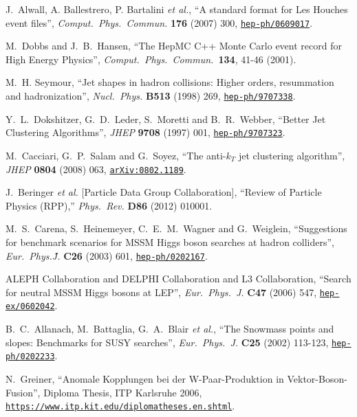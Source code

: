 \documentclass[english,12pt]{article}
\begin{document}
\begin{thebibliography}{10}
J.~Alwall, A. Ballestrero, P. Bartalini {\em et al.}, ``A standard format for Les Houches event files'', {\em
  Comput.\ Phys.\ Commun.} {\bf 176} (2007) 300,
\href{https://www.arXiv.org/abs/hep-ph/0609017}{{\tt hep-ph/0609017}}.

  M.~Dobbs and J.~B.~Hansen,
  ``The HepMC C++ Monte Carlo event record for High Energy Physics'',
  {\em Comput.\ Phys.\ Commun.\  }{\bf 134}, 41-46 (2001).

M.~H. Seymour, ``{Jet shapes in hadron collisions: Higher orders, resummation
  and hadronization}'', {\em Nucl.\ Phys.} {\bf B513} (1998) 269,
\href{https://www.arXiv.org/abs/hep-ph/9707338}{{\tt hep-ph/9707338}}.

  Y.~L.~Dokshitzer, G.~D.~Leder, S.~Moretti and B.~R.~Webber,
  ``Better Jet Clustering Algorithms'',
  {\em JHEP} {\bf 9708} (1997) 001,
  \href{https://arxiv.org/abs/hep-ph/9707323}{{\tt hep-ph/9707323}}.

  M.~Cacciari, G.~P.~Salam and G.~Soyez,
  ``The anti-$k_T$ jet clustering algorithm'',
  {\em JHEP} {\bf 0804} (2008) 063,
  \href{https://arxiv.org/abs/0802.1189}{{\tt arXiv:0802.1189}}.

  J.~Beringer {\it et al.}  [Particle Data Group Collaboration],
  ``Review of Particle Physics (RPP),''
   {\em Phys.\ Rev.} {\bf D86} (2012) 010001.

  M.~S.~Carena, S.~Heinemeyer, C.~E.~M.~Wagner and G.~Weiglein,
  ``Suggestions for benchmark scenarios for MSSM Higgs boson searches at
  hadron colliders'',
  {\em Eur.\ Phys.\~J.} {\bf C26} (2003) 601,
\href{https://www.arXiv.org/abs/hep-ph/0202167}{{\tt hep-ph/0202167}}.

  ALEPH Collaboration and DELPHI Collaboration and L3 Collaboration,
  ``Search for neutral MSSM Higgs bosons at LEP'',
  {\em Eur.\ Phys.\ J.} {\bf C47} (2006) 547,
\href{https://www.arXiv.org/abs/hep-ex/0602042}{{\tt hep-ex/0602042}}.

  B.~C.~Allanach, M.~Battaglia, G.~A.~Blair {\it et al.},
  ``The Snowmass points and slopes: Benchmarks for SUSY searches'',
  {\em Eur.\ Phys.\ J.}  {\bf C25} (2002) 113-123,
\href{https://www.arXiv.org/abs/hep-ph/0202233}{{\tt hep-ph/0202233}}.
  
N.~Greiner, ``Anomale Kopplungen bei der W-Paar-Produktion in
  Vektor-Boson-Fusion'', {Diploma Thesis, ITP Karlsruhe 2006},
\href{https://www.itp.kit.edu/diplomatheses.en.shtml}{{\tt https://www.itp.kit.edu/diplomatheses.en.shtml}}.


\end{thebibliography}
\end{document}
